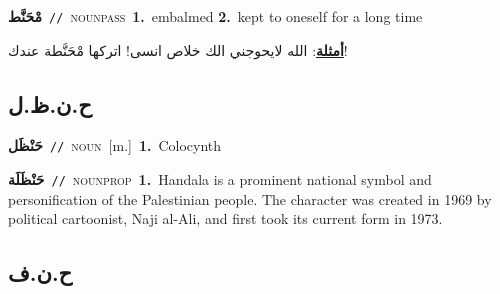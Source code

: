 \documentclass[10pt,a4paper,twoside]{article} %
\begin{document}
\begin{multicols}{2}
{\setlength\topsep{0pt}\textbf{\foreignlanguage{arabic}{مْحَنَّط}}\ {\color{gray}\texttt{//}\color{black}}\ \textsc{noun\textunderscore pass}\ \textbf{1.}~embalmed  \textbf{2.}~kept to oneself for a long time\  \begin{flushright}\color{gray}\foreignlanguage{arabic}{\textbf{\underline{\foreignlanguage{arabic}{أمثلة}}}: الله لايحوجني الك خلاص انسى! اتركها مْحَنَّطة عندك!}\end{flushright}\color{black}} \vspace{2mm}

\vspace{-3mm}
\subsection*{\color{blue}\foreignlanguage{arabic}{ح.ن.ظ.ل}\color{blue}{}} 

{\setlength\topsep{0pt}\textbf{\foreignlanguage{arabic}{حَنْظَل}}\ {\color{gray}\texttt{//}\color{black}}\ \textsc{noun}\ [m.]\ \textbf{1.}~Colocynth\ } \vspace{2mm}

{\setlength\topsep{0pt}\textbf{\foreignlanguage{arabic}{حَنْظَلَة}}\ {\color{gray}\texttt{//}\color{black}}\ \textsc{noun\textunderscore prop}\ \textbf{1.}~Handala is a prominent national symbol and personification of the Palestinian people. The character was created in 1969 by political cartoonist, Naji al-Ali, and first took its current form in 1973.\ } \vspace{2mm}

\vspace{-3mm}
\subsection*{\color{blue}\foreignlanguage{arabic}{ح.ن.ف}\color{blue}{}} 


\end{multicols}
\end{document}
